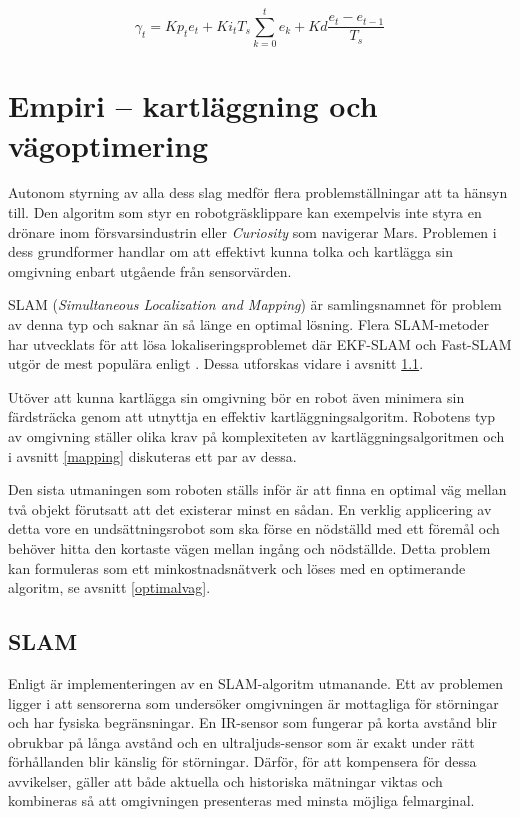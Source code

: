 \documentclass[11pt]{article}
\begin{document}
\begin{flushleft}
\begin{equation}
	\gamma_t = Kp_t e_t + Ki_t T_s \displaystyle\sum_{k=0}^{t} e_k + Kd \frac {e_t - e_{t-1}}{T_s}
\end{equation}

\pagebreak
\section{Empiri -- kartläggning och vägoptimering}
Autonom styrning av alla dess slag medför flera problemställningar att ta hänsyn till. Den algoritm som styr en robotgräsklippare kan exempelvis inte styra en drönare inom försvarsindustrin eller \emph{Curiosity} som navigerar Mars. Problemen i dess grundformer handlar om att effektivt kunna tolka och kartlägga sin omgivning enbart utgående från sensorvärden.

SLAM (\emph{Simultaneous Localization and Mapping}) är samlingsnamnet för problem av denna typ och saknar än så länge en optimal lösning. Flera SLAM-metoder har utvecklats för att lösa lokaliseringsproblemet där EKF-SLAM och Fast-SLAM utgör de mest populära enligt \cite{rat}. Dessa utforskas vidare i avsnitt \ref{slam}.

Utöver att kunna kartlägga sin omgivning bör en robot även minimera sin färdsträcka genom att utnyttja en effektiv kartläggningsalgoritm. Robotens typ av omgivning ställer olika krav på komplexiteten av kartläggningsalgoritmen och i avsnitt \ref{mapping} diskuteras ett par av dessa.

Den sista utmaningen som roboten ställs inför är att finna en optimal väg mellan två objekt förutsatt att det existerar minst en sådan. En verklig applicering av detta vore en undsättningsrobot som ska förse en nödställd med ett föremål och behöver hitta den kortaste vägen mellan ingång och nödställde. Detta problem kan formuleras som ett minkostnadsnätverk och löses med en optimerande algoritm, se avsnitt \ref{optimalvag}. 

\subsection{SLAM}
\label{slam}
Enligt \cite{ekf} är implementeringen av en SLAM-algoritm utmanande. Ett av problemen ligger i att sensorerna som undersöker omgivningen är mottagliga för störningar och har fysiska begränsningar. En IR-sensor som fungerar på korta avstånd blir obrukbar på långa avstånd och en ultraljuds-sensor som är exakt under rätt förhållanden blir känslig för störningar. Därför, för att kompensera för dessa avvikelser, gäller att både aktuella och historiska mätningar viktas och kombineras så att omgivningen presenteras med minsta möjliga felmarginal. 


\end{flushleft}
\end{document}
